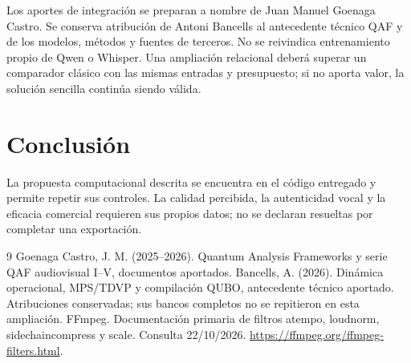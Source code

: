 \documentclass[10pt,a4paper]{article}
\begin{document}
Los aportes de integración se preparan a nombre de Juan Manuel Goenaga Castro. Se conserva atribución de Antoni Bancells al antecedente técnico QAF y de los modelos, métodos y fuentes de terceros. No se reivindica entrenamiento propio de Qwen o Whisper. Una ampliación relacional deberá superar un comparador clásico con las mismas entradas y presupuesto; si no aporta valor, la solución sencilla continúa siendo válida.
\section{Conclusión}
La propuesta computacional descrita se encuentra en el código entregado y permite repetir sus controles. La calidad percibida, la autenticidad vocal y la eficacia comercial requieren sus propios datos; no se declaran resueltas por completar una exportación.
\begin{thebibliography}{9}
 Goenaga Castro, J. M. (2025--2026). Quantum Analysis Frameworks y serie QAF audiovisual I--V, documentos aportados. Bancells, A. (2026). Dinámica operacional, MPS/TDVP y compilación QUBO, antecedente técnico aportado. Atribuciones conservadas; sus bancos completos no se repitieron en esta ampliación.
 FFmpeg. Documentación primaria de filtros atempo, loudnorm, sidechaincompress y scale. Consulta 22/10/2026. \url{https://ffmpeg.org/ffmpeg-filters.html}.
\end{thebibliography}
\end{document}
